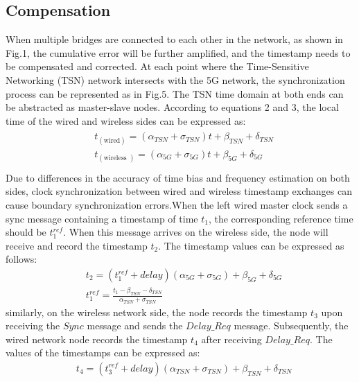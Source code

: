 \documentclass[english]{cccconf}
\begin{document}
{\subsection{Compensation}
When multiple bridges are connected to each other in the network, as shown in Fig.1, the cumulative error will be further amplified, and the timestamp needs to be compensated and corrected. At each point where the Time-Sensitive Networking (TSN) network intersects with the 5G network, the synchronization process can be represented as in Fig.5. The TSN time domain at both ends can be abstracted as master-slave nodes. According to equations 2 and 3, the local time of the wired and wireless sides can be expressed as:
\begin{eqnarray}
	\begin{aligned}
		&t_{(\text {wired})}=\left(\alpha_{TSN}+\sigma_{TSN}\right) t+\beta_{TSN}+\delta_{TSN}\\
		&t_{(\text {wireless })}=\left(\alpha_{5G}+\sigma_{5G}\right) t+\beta_{5G}+\delta_{5G}\\
	\end{aligned}
\end{eqnarray}
Due to differences in the accuracy of time bias and frequency estimation on both sides, clock synchronization between wired and wireless timestamp exchanges can cause boundary synchronization errors.When the left wired master clock sends a sync message containing a timestamp of time $t_1$, the corresponding reference time should be $t_1^{ref}$. When this message arrives on the wireless side, the node will receive and record the timestamp $t_2$. The timestamp values can be expressed as follows:
\begin{equation}
	\begin{split}
		&t_{2}=(t_1^{ref}+delay)(\alpha_{5G}+\sigma_{5G})+\beta_{5G}+\delta_{5G} \\
		&t_1^{ref}=\frac{t_{1}-\beta_{TSN}-\delta_{TSN}}{\alpha_{TSN}+\sigma_{TSN}}
	\end{split}
\end{equation}
similarly, on the wireless network side, the node records the timestamp $t_3$ upon receiving the $Sync$ message and sends the  $Delay\_Req$ message. Subsequently, the wired network node records the timestamp $t_4$ after receiving  $Delay\_Req$. The values of the timestamps can be expressed as:
\begin{equation}
	\begin{split}
		&t_{4}=(t_3^{ref}+delay)(\alpha_{TSN}+\sigma_{TSN})+\beta_{TSN}+\delta_{TSN} \\

\end{split}
\end{equation}}
\end{document}
